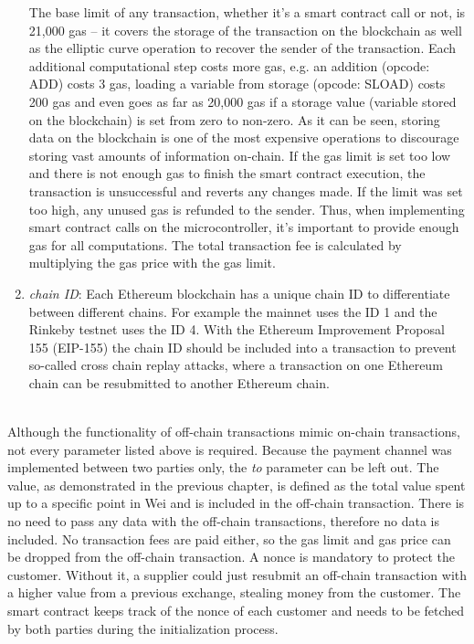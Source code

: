 \begin{enumerate}
  The base limit of any transaction, whether it's a smart contract call or not, is 21,000 gas – it covers the storage of the transaction on the blockchain as well as the elliptic curve operation to recover the sender of the transaction\cite{design-rationale}.
  Each additional computational step costs more gas, e.g. an addition (opcode: ADD) costs 3 gas, loading a variable from storage (opcode: SLOAD) costs 200 gas and even goes as far as 20,000 gas if a storage value (variable stored on the blockchain) is set from zero to non-zero.
  As it can be seen, storing data on the blockchain is one of the most expensive operations to discourage storing vast amounts of information on-chain.
  If the gas limit is set too low and there is not enough gas to finish the smart contract execution, the transaction is unsuccessful and reverts any changes made.
  If the limit was set too high, any unused gas is refunded to the sender.
  Thus, when implementing smart contract calls on the microcontroller, it's important to provide enough gas for all computations.
  The total transaction fee is calculated by multiplying the gas price with the gas limit.
  \item \textit{chain ID}: Each Ethereum blockchain has a unique chain ID to differentiate between different chains.
  For example the mainnet uses the ID 1 and the Rinkeby testnet uses the ID 4.
  With the Ethereum Improvement Proposal 155 (EIP-155)\cite{eip-155} the chain ID should be included into a transaction to prevent so-called cross chain replay attacks, where a transaction on one Ethereum chain can be resubmitted to another Ethereum chain.
\end{enumerate}
\leavevmode
\\
Although the functionality of off-chain transactions mimic on-chain transactions, not every parameter listed above is required.
Because the payment channel was implemented between two parties only, the \textit{to} parameter can be left out.
The value, as demonstrated in the previous chapter, is defined as the total value spent up to a specific point in Wei and is included in the off-chain transaction.
There is no need to pass any data with the off-chain transactions, therefore no data is included.
No transaction fees are paid either, so the gas limit and gas price can be dropped from the off-chain transaction.
A nonce is mandatory to protect the customer. Without it, a supplier could just resubmit an off-chain transaction with a higher value from a previous exchange, stealing money from the customer. The smart contract keeps track of the nonce of each customer and needs to be fetched by both parties during the initialization process.
